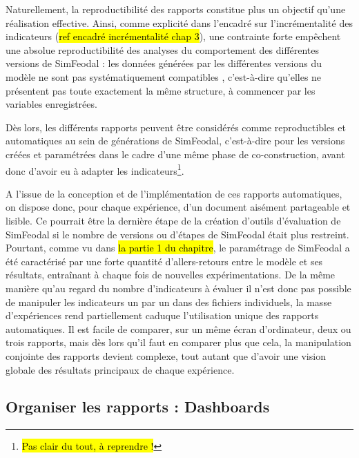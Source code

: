 	
%
%

	
	Naturellement, la reproductibilité des rapports constitue plus un objectif qu'une réalisation effective.
	Ainsi, comme explicité dans l'encadré sur l'incrémentalité des indicateurs (\hl{ref encadré incrémentalité chap 3}), une contrainte forte empêchent une absolue reproductibilité des analyses du comportement des différentes versions de SimFeodal : les données générées par les différentes versions du modèle ne sont pas systématiquement \og compatibles \fg{}, c'est-à-dire qu'elles ne présentent pas toute exactement la même structure, à commencer par les variables enregistrées.

	Dès lors, les différents rapports peuvent être considérés comme reproductibles et automatiques au sein de \og générations \fg{} de SimFeodal, c'est-à-dire pour les versions créées et paramétrées dans le cadre d'une même phase de co-construction, avant donc d'avoir eu à adapter les indicateurs\footnote{
	\hl{Pas clair du tout, à reprendre !}
	}.

	A l'issue de la conception et de l'implémentation de ces rapports automatiques, on dispose donc, pour chaque expérience, d'un document aisément partageable et lisible.
	Ce pourrait être la dernière étape de la création d'outils d'évaluation de SimFeodal si le nombre de versions ou d'étapes de SimFeodal était plus restreint.
	Pourtant, comme vu dans \hl{la partie 1 du chapitre}, le paramétrage de SimFeodal a été caractérisé par une forte quantité d'allers-retours entre le modèle et ses résultats, entraînant à chaque fois de nouvelles expérimentations.
	De la même manière qu'au regard du nombre d'indicateurs à évaluer il n'est donc pas possible de manipuler les indicateurs un par un dans des fichiers individuels, la masse d'expériences rend partiellement caduque l'utilisation unique des rapports automatiques.
	Il est facile de comparer, sur un même écran d'ordinateur, deux ou trois rapports, mais dès lors qu'il faut en comparer plus que cela, la manipulation conjointe des rapports devient complexe, tout autant que d'avoir une vision globale des résultats principaux de chaque expérience.

	\subsection{Organiser les rapports : Dashboards}

